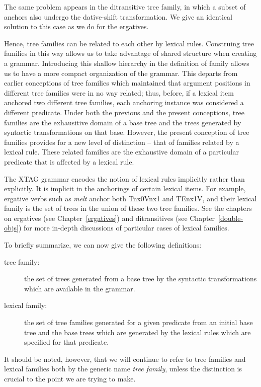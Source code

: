 The same problem appears in the ditransitive tree family, in which a subset of
anchors also undergo the dative-shift transformation. We give an identical
solution to this case as we do for the ergatives.

Hence, tree families can be related to each other by lexical rules.
Construing tree families in this way allows us to take advantage of
shared structure when creating a grammar. Introducing this shallow
hierarchy in the definition of family allows us to have a more compact
organization of the grammar. This departs from earlier conceptions of
tree families which maintained that argument positions in different
tree families were in no way related; thus, before, if a lexical item
anchored two different tree families, each anchoring instance was
considered a different predicate.  Under both the previous and the
present conceptions, tree families are the exhausitive domain of a
base tree and the trees generated by syntactic transformations on that
base.  However, the present conception of tree families provides for a
new level of distinction -- that of families related by a lexical
rule. These related families are the exhaustive domain of a particular
predicate that is affected by a lexical rule.

The XTAG grammar encodes the notion of lexical rules implicitly rather
than explicitly. It is implicit in the anchorings of certain lexical
items.  For example, ergative verbs such as {\it melt} anchor both
Tnx0Vnx1 and TEnx1V, and their lexical family is the set of trees in
the union of these two tree families.  See the chapters on ergatives
(see Chapter~\ref{ergatives}) and ditransitives (see
Chapter~\ref{double-objs}) for more in-depth discussions of particular
cases of lexical families.

To briefly summarize, we can now give the following definitions:

\begin{description}
\item[tree family:] the set of trees generated from a base tree by the
syntactic transformations which are available in the grammar.

\item[lexical family:] the set of tree families generated for a given
predicate from an initial base tree and the base trees which are
generated by the lexical rules which are specified for that predicate.

\end{description}

It should be noted, however, that we will continue to refer to tree families
and lexical families both by the generic name {\it tree family}, unless the
distinction is crucial to the point we are trying to make.
